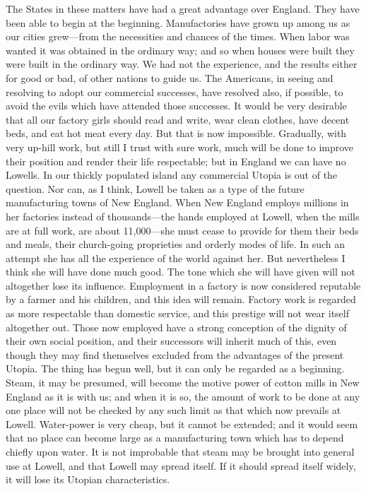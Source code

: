 The States in these matters have had a great advantage over
England.  They have been able to begin at the beginning.
Manufactories have grown up among us as our cities grew---from the
necessities and chances of the times.  When labor was wanted it was
obtained in the ordinary way; and so when houses were built they
were built in the ordinary way.  We had not the experience, and the
results either for good or bad, of other nations to guide us.  The
Americans, in seeing and resolving to adopt our commercial
successes, have resolved also, if possible, to avoid the evils
which have attended those successes.  It would be very desirable
that all our factory girls should read and write, wear clean
clothes, have decent beds, and eat hot meat every day.  But that is
now impossible.  Gradually, with very up-hill work, but still I
trust with sure work, much will be done to improve their position
and render their life respectable; but in England we can have no
Lowells.  In our thickly populated island any commercial Utopia is
out of the question.  Nor can, as I think, Lowell be taken as a
type of the future manufacturing towns of New England.  When New
England employs millions in her factories instead of thousands---the
hands employed at Lowell, when the mills are at full work, are
about 11,000---she must cease to provide for them their beds and
meals, their church-going proprieties and orderly modes of life.
In such an attempt she has all the experience of the world against
her.  But nevertheless I think she will have done much good.  The
tone which she will have given will not altogether lose its
influence.  Employment in a factory is now considered reputable by
a farmer and his children, and this idea will remain.  Factory work
is regarded as more respectable than domestic service, and this
prestige will not wear itself altogether out.  Those now employed
have a strong conception of the dignity of their own social
position, and their successors will inherit much of this, even
though they may find themselves excluded from the advantages of the
present Utopia.  The thing has begun well, but it can only be
regarded as a beginning.  Steam, it may be presumed, will become
the motive power of cotton mills in New England as it is with us;
and when it is so, the amount of work to be done at any one place
will not be checked by any such limit as that which now prevails at
Lowell.  Water-power is very cheap, but it cannot be extended; and
it would seem that no place can become large as a manufacturing
town which has to depend chiefly upon water.  It is not improbable
that steam may be brought into general use at Lowell, and that
Lowell may spread itself.  If it should spread itself widely, it
will lose its Utopian characteristics.

